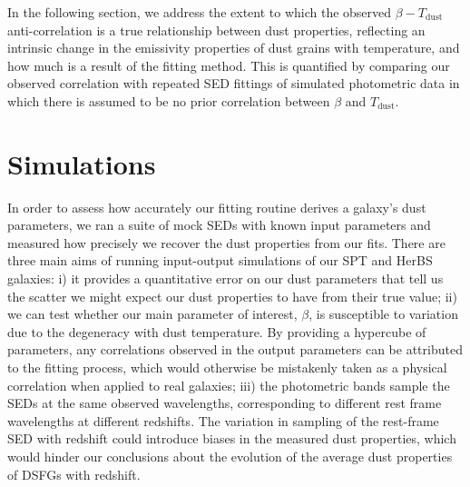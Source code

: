 In the following section, we address the extent to which the observed $\beta-T_{\textrm{dust}}$ anti-correlation is a true relationship between dust properties, reflecting an intrinsic change in the emissivity properties of dust grains with temperature, and how much is a result of the fitting method. This is quantified by comparing our observed correlation with repeated SED fittings of simulated photometric data in which there is assumed to be no prior correlation between $\beta$ and $T_{\textrm{dust}}$.

\section{Simulations}
\label{sec:simulations}

In order to assess how accurately our fitting routine derives a galaxy's dust parameters, we ran a suite of mock SEDs with known input parameters and measured how precisely we recover the dust properties from our fits. There are three main aims of running input-output simulations of our SPT and HerBS galaxies: i) it provides a quantitative error on our dust parameters that tell us the scatter we might expect our dust properties to have from their true value; ii) we can test whether our main parameter of interest, $\beta$, is susceptible to variation due to the degeneracy with dust temperature. By providing a hypercube of parameters, any correlations observed in the output parameters can be attributed to the fitting process, which would otherwise be mistakenly taken as a physical correlation when applied to real galaxies; iii) the photometric bands sample the SEDs at the same observed wavelengths, corresponding to different rest frame wavelengths at different redshifts. The variation in sampling of the rest-frame SED with redshift could introduce biases in the measured dust properties, which would hinder our conclusions about the evolution of the average dust properties of DSFGs with redshift.

